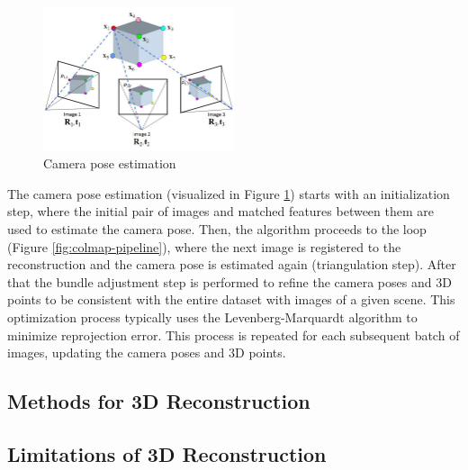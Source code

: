 \begin{figure}[h]
  \centering
  \includegraphics[width=0.5\textwidth]{images/related-work/Structure-from-Motion-SfM-process-is-illustrated-The-structure-in-the.png}
  \caption{Camera pose estimation}
  \label{fig:camera-pose-estimation}
\end{figure}

The camera pose estimation (visualized in Figure
\ref{fig:camera-pose-estimation}) starts with an initialization step,
where the initial pair of images and matched features between them
are used to estimate the camera pose. Then, the algorithm proceeds to
the loop (Figure \ref{fig:colmap-pipeline}), where the next image is
registered to the reconstruction and the camera pose is estimated
again (triangulation step). After that the bundle adjustment step is
performed to refine the camera poses and 3D points to be consistent
with the entire dataset with images of a given scene. This
optimization process typically uses the Levenberg-Marquardt algorithm
to minimize reprojection error. This process is repeated for each
subsequent batch of images, updating the camera poses and 3D points.

\subsection{Methods for 3D Reconstruction}


\subsection{Limitations of 3D Reconstruction}

